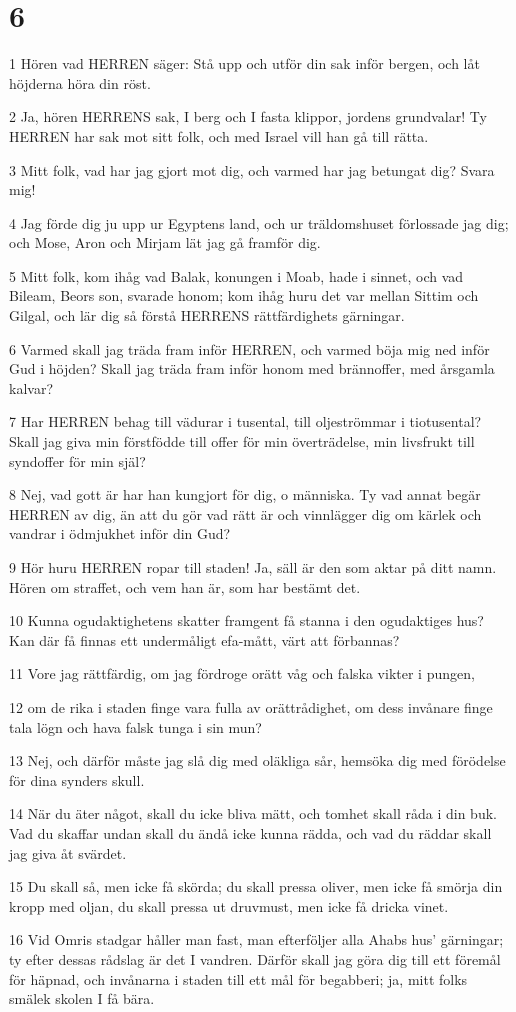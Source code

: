 \chapter{6}

\par 1 Hören vad HERREN säger: Stå upp och utför din sak inför bergen, och låt höjderna höra din röst.
\par 2 Ja, hören HERRENS sak, I berg och I fasta klippor, jordens grundvalar! Ty HERREN har sak mot sitt folk, och med Israel vill han gå till rätta.
\par 3 Mitt folk, vad har jag gjort mot dig, och varmed har jag betungat dig? Svara mig!
\par 4 Jag förde dig ju upp ur Egyptens land, och ur träldomshuset förlossade jag dig; och Mose, Aron och Mirjam lät jag gå framför dig.
\par 5 Mitt folk, kom ihåg vad Balak, konungen i Moab, hade i sinnet, och vad Bileam, Beors son, svarade honom; kom ihåg huru det var mellan Sittim och Gilgal, och lär dig så förstå HERRENS rättfärdighets gärningar.
\par 6 Varmed skall jag träda fram inför HERREN, och varmed böja mig ned inför Gud i höjden? Skall jag träda fram inför honom med brännoffer, med årsgamla kalvar?
\par 7 Har HERREN behag till vädurar i tusental, till oljeströmmar i tiotusental? Skall jag giva min förstfödde till offer för min överträdelse, min livsfrukt till syndoffer för min själ?
\par 8 Nej, vad gott är har han kungjort för dig, o människa. Ty vad annat begär HERREN av dig, än att du gör vad rätt är och vinnlägger dig om kärlek och vandrar i ödmjukhet inför din Gud?
\par 9 Hör huru HERREN ropar till staden! Ja, säll är den som aktar på ditt namn. Hören om straffet, och vem han är, som har bestämt det.
\par 10 Kunna ogudaktighetens skatter framgent få stanna i den ogudaktiges hus? Kan där få finnas ett undermåligt efa-mått, värt att förbannas?
\par 11 Vore jag rättfärdig, om jag fördroge orätt våg och falska vikter i pungen,
\par 12 om de rika i staden finge vara fulla av orättrådighet, om dess invånare finge tala lögn och hava falsk tunga i sin mun?
\par 13 Nej, och därför måste jag slå dig med oläkliga sår, hemsöka dig med förödelse för dina synders skull.
\par 14 När du äter något, skall du icke bliva mätt, och tomhet skall råda i din buk. Vad du skaffar undan skall du ändå icke kunna rädda, och vad du räddar skall jag giva åt svärdet.
\par 15 Du skall så, men icke få skörda; du skall pressa oliver, men icke få smörja din kropp med oljan, du skall pressa ut druvmust, men icke få dricka vinet.
\par 16 Vid Omris stadgar håller man fast, man efterföljer alla Ahabs hus' gärningar; ty efter dessas rådslag är det I vandren. Därför skall jag göra dig till ett föremål för häpnad, och invånarna i staden till ett mål för begabberi; ja, mitt folks smälek skolen I få bära.

